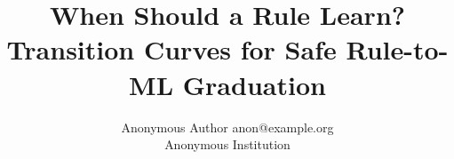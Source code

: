 \documentclass[10pt]{article}
\title{When Should a Rule Learn? Transition Curves for Safe Rule-to-ML Graduation}
\author{\name Anonymous Author \email anon@example.org \\
      \addr Anonymous Institution}
\begin{document}
\maketitle

\begin{abstract}

\end{abstract}


\end{document}
